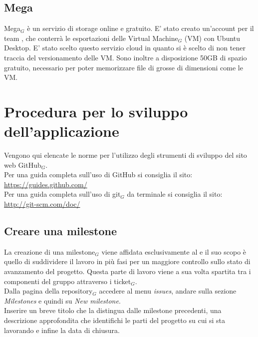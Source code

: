 \subsection{Mega}
Mega$_G$ è un servizio di storage online e gratuito. E' stato creato un'account per il team \gruppo, che conterrà le esportazioni delle Virtual Machine$_G$ (VM) con Ubuntu Desktop. E' stato scelto questo servizio cloud in quanto si è scelto di non tener traccia del versionamento delle VM. Sono inoltre a disposizione 50GB di spazio gratuito, necessario per poter memorizzare file di grosse di dimensioni come le VM.

\newpage
\section{Procedura per lo sviluppo dell'applicazione}
Vengono qui elencate le norme per l'utilizzo degli strumenti di sviluppo del sito web GitHub$_{G}$. \\
Per una guida completa sull'uso di GitHub si consiglia il sito: \\
\url{https://guides.github.com/}\\
Per una guida completa sull'uso di git$_{G}$ da terminale si consiglia il sito: \\
\url{http://git-scm.com/doc/}

\subsection{Creare una milestone}
La creazione di una milestone$_{G}$ viene affidata esclusivamente al \ruoloResponsabile{} e il suo scopo è quello di suddividere il lavoro in più fasi per un maggiore controllo sullo stato di avanzamento del progetto. Questa parte di lavoro viene a sua volta spartita tra i componenti del gruppo attraverso i ticket$_{G}$. \\
    Dalla pagina della repository$_{G}$ accedere al menu \textit{issues}, andare sulla sezione \textit{Milestones} e quindi su \textit{New milestone}.\\
    Inserire un breve titolo che la distingua dalle milestone precedenti, una descrizione approfondita che identifichi le parti del progetto su cui si sta lavorando e infine la data di chiusura.

